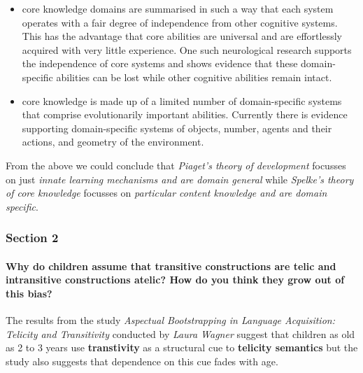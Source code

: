 \documentclass[11pt]{article}
\begin{document}
\begin{itemize}
\item
  core knowledge domains are summarised in such a way that each system
  operates with a fair degree of independence from other cognitive
  systems. This has the advantage that core abilities are universal and
  are effortlessly acquired with very little experience. One such
  neurological research supports the independence of core systems and
  shows evidence that these domain-specific abilities can be lost while
  other cognitive abilities remain intact.
\item
  core knowledge is made up of a limited number of domain-specific
  systems that comprise evolutionarily important abilities. Currently
  there is evidence supporting domain-specific systems of objects,
  number, agents and their actions, and geometry of the environment.
\end{itemize}

From the above we could conclude that \emph{Piaget's theory of
development} focusses on just \emph{innate learning mechanisms and are
domain general} while \emph{Spelke's theory of core knowledge} focusses
on \emph{particular content knowledge and are domain specific}.

    \hypertarget{section-2}{%
\subsubsection{Section 2}\label{section-2}}

\hypertarget{why-do-children-assume-that-transitive-constructions-are-telic-and-intransitive-constructions-atelic-how-do-you-think-they-grow-out-of-this-bias}{%
\paragraph{Why do children assume that transitive constructions are
telic and intransitive constructions atelic? How do you think they grow
out of this
bias?}\label{why-do-children-assume-that-transitive-constructions-are-telic-and-intransitive-constructions-atelic-how-do-you-think-they-grow-out-of-this-bias}}

The results from the study \emph{Aspectual Bootstrapping in Language
Acquisition: Telicity and Transitivity} conducted by \emph{Laura Wagner}
suggest that children as old as 2 to 3 years use \textbf{transtivity} as
a structural cue to \textbf{telicity semantics} but the study also
suggests that dependence on this cue fades with age.
\end{document}
